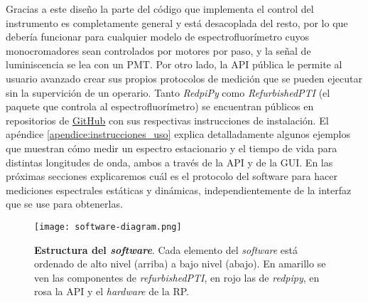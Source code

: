 Gracias a este diseño la parte del código que implementa el control del instrumento es completamente general y está desacoplada del resto, por lo que debería funcionar para cualquier modelo de espectrofluorímetro cuyos monocromadores sean controlados por motores por paso, y la señal de luminiscencia se lea con un PMT.
Por otro lado, la API pública le permite al usuario avanzado crear sus propios protocolos de medición que se pueden ejecutar sin la supervición de un operario.
Tanto \textit{RedpiPy} como \textit{RefurbishedPTI} (el paquete que controla al espectrofluorímetro) se encuentran públicos en repositorios de \href{https://github.com}{GitHub} con sus respectivas instrucciones de instalación. 
El apéndice \ref{apendice:instrucciones_uso} explica detalladamente algunos ejemplos que muestran cómo medir un espectro estacionario y el tiempo de vida para distintas longitudes de onda, ambos a través de la API y de la GUI.
En las próximas secciones explicaremos cuál es el protocolo del software para hacer mediciones espectrales estáticas y dinámicas, independientemente de la interfaz que se use para obtenerlas.



\begin{figure}[t]
     \centering
     \texttt{[image: software-diagram.png]}
     \caption{\textbf{Estructura del \textit{software}}. Cada elemento del \textit{software} está ordenado de alto nivel (arriba) a bajo nivel (abajo). En amarillo se ven las componentes de \textit{refurbishedPTI}, en rojo las de \textit{redpipy}, en rosa la API y el \textit{hardware} de la RP.}
     \label{fig:code}
\end{figure}



